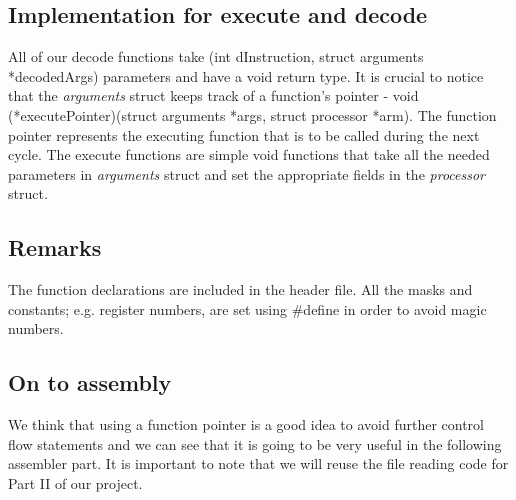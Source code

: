 \documentclass[11pt]{article}
\begin{document}
	 \subsection{Implementation for execute and decode}
	 All of our decode functions take (int dInstruction, struct arguments *decodedArgs) parameters and have a void return type. It is crucial to notice that the \textit{arguments} struct keeps track of a function's pointer - void (*executePointer)(struct arguments *args, struct processor *arm). The function pointer represents the executing function that is to be called during the next cycle. The execute functions are simple void functions that take all the needed parameters in \textit{arguments} struct and set the appropriate fields in the \textit{processor} struct.
	 
	\subsection{Remarks}
	The function declarations are included in the header file. All the masks and constants; e.g. register numbers, are set using #define in order to avoid magic numbers. 
	\subsection{On to assembly}
	We think that using a function pointer is a good idea to avoid further control flow statements and we can see that it is going to be very useful in the following assembler part. It is important to note that we will reuse the file reading code for Part II of our project.
\end{document}
